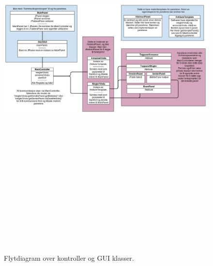 \begin{figure}[ht]
\begin{center}
 \includegraphics[angle=90, height=21cm]{./img/appendix/diagram/controller_og_gui.png}
 \caption{Flytdiagram over kontroller og GUI klasser.}
 \label{fig:kontroller_og_gui}
 \end{center}
\end{figure}


